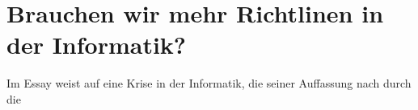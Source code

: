 

\section{Brauchen wir mehr Richtlinen in der Informatik?}
Im Essay  weist  auf eine Krise in der Informatik, die seiner
Auffassung nach durch die 
